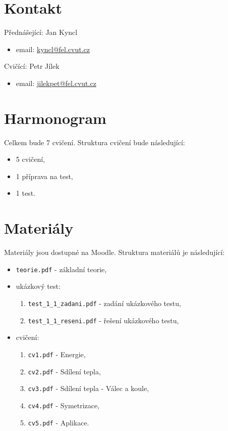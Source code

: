 \documentclass{article}
\begin{document}
\maketitle
\tableofcontents
\newpage




\section{Kontakt}
Přednášející: Jan Kyncl
\begin{itemize}
    \item email: \href{mailto:kyncl@fel.cvut.cz}{kyncl@fel.cvut.cz}
\end{itemize}

Cvičící: Petr Jílek
\begin{itemize}
    \item email: \href{mailto:jilekpet@fel.cvut.cz}{jilekpet@fel.cvut.cz}
\end{itemize}




\section{Harmonogram}
Celkem bude 7 cvičení. Struktura cvičení bude následující:
\begin{itemize}
    \item 5 cvičení,
    \item 1 příprava na test,
    \item 1 test.
\end{itemize}




\section{Materiály}
Materiály jsou dostupné na Moodle. Struktura materiálů je následující:
\begin{itemize}
    \item \texttt{teorie.pdf} - základní teorie,
    \item ukázkový test:
          \begin{enumerate}
              \item \texttt{test\_1\_1\_zadani.pdf} - zadání ukázkového testu,
              \item \texttt{test\_1\_1\_reseni.pdf} - řešení ukázkového testu,
          \end{enumerate}
    \item cvičení:
          \begin{enumerate}
              \item \texttt{cv1.pdf} - Energie,
              \item \texttt{cv2.pdf} - Sdílení tepla,
              \item \texttt{cv3.pdf} - Sdílení tepla - Válec a koule,
              \item \texttt{cv4.pdf} - Symetrizace,
              \item \texttt{cv5.pdf} - Aplikace.
          \end{enumerate}
\end{itemize}
\end{document}
